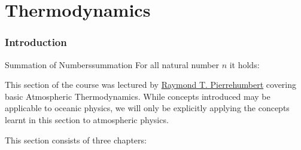 \part{Thermodynamics}\label{Thermodynamics}

\section*{Introduction}

\begin{idea}{Summation of Numbers}{summation}
  For all natural number $n$ it holds:
\end{idea}

This section of the course was lectured by \href{https://users.physics.ox.ac.uk/~pierrehumbert/}{Raymond T. Pierrehumbert} covering basic Atmospheric Thermodynamics. While concepts introduced may be applicable to oceanic physics, we will only be explicitly applying the concepts learnt in this section to atmospheric physics.\vspace{5 mm}

\noindent This section consists of three chapters:\vspace{5 mm}

